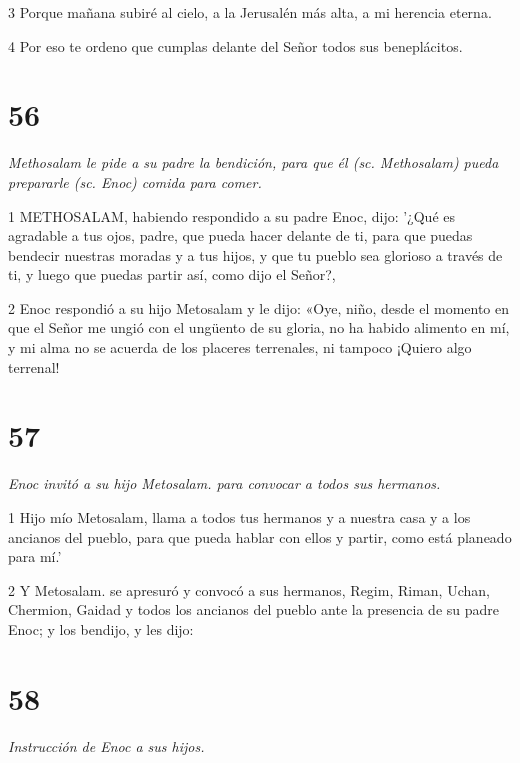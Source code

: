 \par 3 Porque mañana subiré al cielo, a la Jerusalén más alta, a mi herencia eterna.

\par 4 Por eso te ordeno que cumplas delante del Señor todos sus beneplácitos.

\chapter{56}

\par \textit{Methosalam le pide a su padre la bendición, para que él (sc. Methosalam) pueda prepararle (sc. Enoc) comida para comer.}

\par 1 METHOSALAM, habiendo respondido a su padre Enoc, dijo: '¿Qué es agradable a tus ojos, padre, que pueda hacer delante de ti, para que puedas bendecir nuestras moradas y a tus hijos, y que tu pueblo sea glorioso a través de ti, y luego que puedas partir así, como dijo el Señor?,

\par 2 Enoc respondió a su hijo Metosalam y le dijo: «Oye, niño, desde el momento en que el Señor me ungió con el ungüento de su gloria, no ha habido alimento en mí, y mi alma no se acuerda de los placeres terrenales, ni tampoco ¡Quiero algo terrenal!

\chapter{57}

\par \textit{Enoc invitó a su hijo Metosalam. para convocar a todos sus hermanos.}

\par 1 Hijo mío Metosalam, llama a todos tus hermanos y a nuestra casa y a los ancianos del pueblo, para que pueda hablar con ellos y partir, como está planeado para mí.'

\par 2 Y Metosalam. se apresuró y convocó a sus hermanos, Regim, Riman, Uchan, Chermion, Gaidad y todos los ancianos del pueblo ante la presencia de su padre Enoc; y los bendijo, y les dijo:

\chapter{58}

\par \textit{Instrucción de Enoc a sus hijos.}

